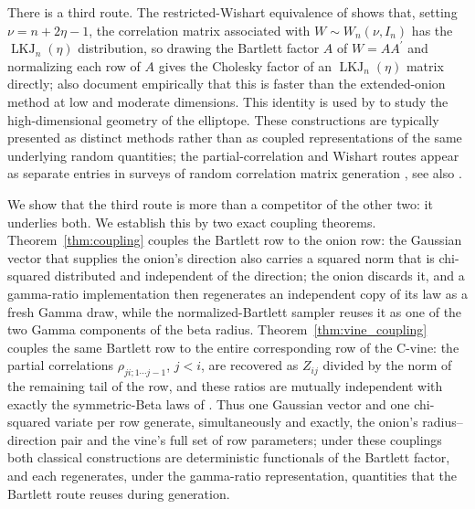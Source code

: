 \documentclass[12pt,english]{article}
\theoremstyle{plain} %
\theoremstyle{definition} %
\theoremstyle{remark} %
\begin{document}
There is a third route. The restricted-Wishart equivalence of \citet{WangWuChu:2018} shows that, setting $\nu=n+2\eta-1$, the correlation matrix associated with $W\sim W_n(\nu,I_n)$ has the $\operatorname{LKJ}_n(\eta)$ distribution, so drawing the Bartlett factor $A$ of $W=AA^\prime$ and normalizing each row of $A$ gives the Cholesky factor of an $\operatorname{LKJ}_n(\eta)$ matrix directly; \citet{WangWuChu:2018} also document empirically that this is faster than the extended-onion method at low and moderate dimensions. This identity is used by \citet{Hansen:CorrelationMatrix} to study the high-dimensional geometry of the elliptope. These constructions are typically presented as distinct methods rather than as coupled representations of the same underlying random quantities; the partial-correlation and Wishart routes appear as separate entries in surveys of random correlation matrix generation \citep[Sections~4.5 and~4.6]{ArchakovHansenLuo-RandomCorr:2024}, see also \citet{Pourahmadi2011}.

We show that the third route is more than a competitor of the other two: it underlies both. We establish this by two exact coupling theorems. Theorem~\ref{thm:coupling} couples the Bartlett row to the onion row: the Gaussian vector that supplies the onion's direction also carries a squared norm that is chi-squared distributed and independent of the direction; the onion discards it, and a gamma-ratio implementation then regenerates an independent copy of its law as a fresh Gamma draw, while the normalized-Bartlett sampler reuses it as one of the two Gamma components of the beta radius. Theorem~\ref{thm:vine_coupling} couples the same Bartlett row to the entire corresponding row of the C-vine: the partial correlations $\rho_{ji;1\cdots j-1}$, $j<i$, are recovered as $Z_{ij}$ divided by the norm of the remaining tail of the row, and these ratios are mutually independent with exactly the symmetric-Beta laws of \citet{LewandowskiKurowickaJoe:2009}. Thus one Gaussian vector and one chi-squared variate per row generate, simultaneously and exactly, the onion's radius--direction pair and the vine's full set of row parameters; under these couplings both classical constructions are deterministic functionals of the Bartlett factor, and each regenerates, under the gamma-ratio representation, quantities that the Bartlett route reuses during generation.
\end{document}
